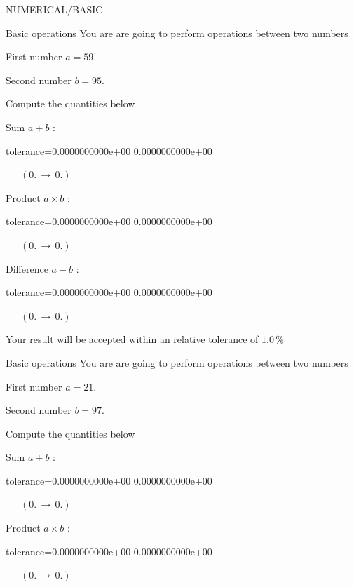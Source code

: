 \documentclass[12pt]{article}
\begin{document}
\begin{quiz}{NUMERICAL/BASIC} 

 \begin{cloze}{Basic operations} 
You are are going to perform operations between two numbers

First number $a = 59.\, $

Second number $b = 95.\, $

 

Compute the quantities below

Sum $ a + b $ : 
\begin{numerical}[points=1] 
\item[tolerance={0.0000000000e+00}] 0.0000000000e+00 
\end{numerical} 
 $\,$ 
 $ \quad (0. \, \rightarrow \, 0.) $ 

Product $ a \times b $ : 
\begin{numerical}[points=1] 
\item[tolerance={0.0000000000e+00}] 0.0000000000e+00 
\end{numerical} 
 $\,$ 
 $ \quad (0. \, \rightarrow \, 0.) $ 

Difference $ a - b $ : 
\begin{numerical}[points=1] 
\item[tolerance={0.0000000000e+00}] 0.0000000000e+00 
\end{numerical} 
 $\,$ 
 $ \quad (0. \, \rightarrow \, 0.) $ 

Your result will be accepted within an relative tolerance of $1.0\, \% $

\end{cloze} 


 \begin{cloze}{Basic operations} 
You are are going to perform operations between two numbers

First number $a = 21.\, $

Second number $b = 97.\, $

 

Compute the quantities below

Sum $ a + b $ : 
\begin{numerical}[points=1] 
\item[tolerance={0.0000000000e+00}] 0.0000000000e+00 
\end{numerical} 
 $\,$ 
 $ \quad (0. \, \rightarrow \, 0.) $ 

Product $ a \times b $ : 
\begin{numerical}[points=1] 
\item[tolerance={0.0000000000e+00}] 0.0000000000e+00 
\end{numerical} 
 $\,$ 
 $ \quad (0. \, \rightarrow \, 0.) $ 


\end{cloze}
\end{quiz}
\end{document}
